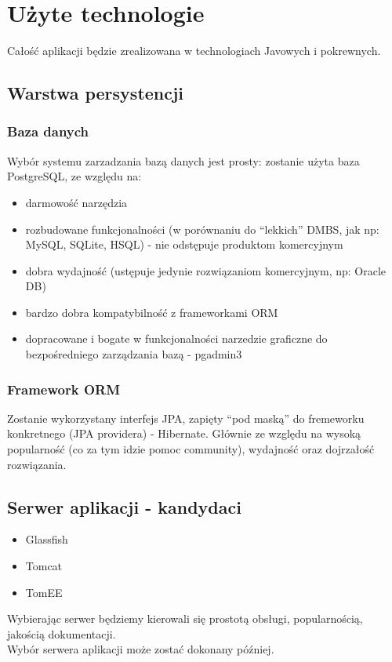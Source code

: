 \documentclass[a4paper,12pt,notitlepage]{mwrep}
\begin{document}
\section{Użyte technologie}
Całość aplikacji będzie zrealizowana w technologiach Javowych i pokrewnych.

\subsection{Warstwa persystencji}
\subsubsection{Baza danych}
Wybór systemu zarzadzania bazą danych jest prosty: zostanie użyta baza PostgreSQL,
ze względu na:
\begin{itemize}
	\item	darmowość narzędzia
	\item	rozbudowane funkcjonalności (w porównaniu do “lekkich” DMBS, jak np: MySQL, SQLite, HSQL) - nie odstępuje produktom komercyjnym
	\item	dobra wydajność (ustępuje jedynie rozwiązaniom komercyjnym, np: Oracle DB)
	\item	bardzo dobra kompatybilność z frameworkami ORM
	\item	dopracowane i bogate w funkcjonalności narzedzie graficzne do bezpośredniego zarządzania bazą - pgadmin3
\end{itemize}
\subsubsection{Framework ORM}
Zostanie wykorzystany interfejs JPA, zapięty “pod maską” do fremeworku
konkretnego (JPA providera) - Hibernate. Głównie ze względu na wysoką popularność
(co za tym idzie pomoc community), wydajność oraz dojrzałość rozwiązania.

\subsection{Serwer aplikacji - kandydaci}
\begin{itemize}
	\item	Glassfish
	\item	Tomcat
	\item	TomEE
\end{itemize}
Wybierając serwer będziemy kierowali się prostotą obsługi, popularnością, jakością dokumentacji.\\
Wybór serwera aplikacji może zostać dokonany później.
\end{document}
